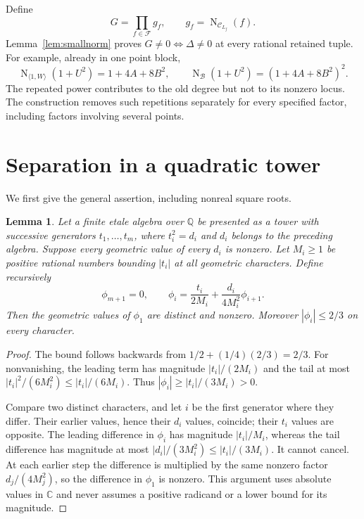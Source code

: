 \documentclass[11pt,a4paper]{article}
\newtheorem{lemma}[theorem]{Lemma}
\theoremstyle{remark}\newtheorem{remark}[theorem]{Remark}
\newcommand{\Q}{\mathbb Q}\newcommand{\Z}{\mathbb Z}\newcommand{\F}{\mathbb F}\newcommand{\C}{\mathbb C}
\DeclareMathOperator{\N}{N}\DeclareMathOperator{\Tr}{Tr}\DeclareMathOperator{\Span}{Span}
\begin{document}
Define
\begin{equation}\label{eq:newguard}
                            G=\prod_{f\in\mathcal F}g_f,
                 \qquad g_f=\N_{\mathcal C_{L_f}}(f).
\end{equation}
Lemma~\ref{lem:smallnorm} proves $G\ne0\iff\Delta\ne0$ at every
rational retained tuple. For example, already in one point block,
\[
 \N_{\langle1,W\rangle}(1+U^2)=1+4A+8B^2,
 \qquad \N_{\mathcal B}(1+U^2)=(1+4A+8B^2)^2.
\]
The repeated power contributes to the old degree but not to its
nonzero locus. The construction removes such repetitions separately
for every specified factor, including factors involving several points.

\section{Separation in a quadratic tower}
We first give the general assertion, including nonreal square roots.

\begin{lemma}\label{lem:tower}
Let a finite etale algebra over $\Q$ be presented as a tower with
successive generators $t_1,\ldots,t_m$, where
$t_i^2=d_i$ and $d_i$ belongs to the preceding algebra. Suppose every
geometric value of every $d_i$ is nonzero. Let $M_i\ge1$ be positive
rational numbers bounding $|t_i|$ at all geometric characters.
Define recursively
\[
 \phi_{m+1}=0,\qquad
 \phi_i=\frac{t_i}{2M_i}+\frac{d_i}{4M_i^2}\phi_{i+1}.
\]
Then the geometric values of $\phi_1$ are distinct and nonzero.
Moreover $|\phi_i|\le2/3$ on every character.
\end{lemma}
\begin{proof}
The bound follows backwards from $1/2+(1/4)(2/3)=2/3$.
For nonvanishing, the leading term has magnitude $|t_i|/(2M_i)$
and the tail at most $|t_i|^2/(6M_i^2)\le|t_i|/(6M_i)$.
Thus $|\phi_i|\ge|t_i|/(3M_i)>0$.

Compare two distinct characters, and let $i$ be the first generator
where they differ. Their earlier values, hence their $d_i$ values,
coincide; their $t_i$ values are opposite. The leading difference in
$\phi_i$ has magnitude $|t_i|/M_i$, whereas the tail difference has
magnitude at most $|d_i|/(3M_i^2)\le|t_i|/(3M_i)$.
It cannot cancel. At each earlier step the difference is multiplied
by the same nonzero factor $d_j/(4M_j^2)$, so the difference in
$\phi_1$ is nonzero. This argument uses absolute values in $\C$ and
never assumes a positive radicand or a lower bound for its magnitude.
\end{proof}
\end{document}
